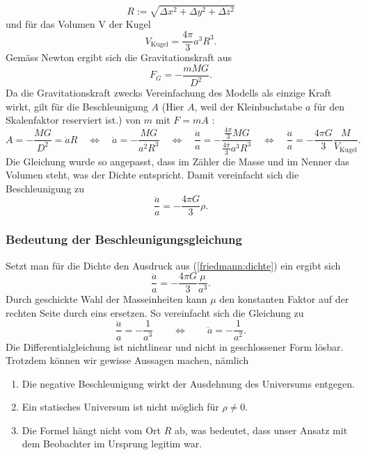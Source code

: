 \begin{refsection}
\[
R
:=
\sqrt{\Delta x^2 + \Delta y^2 + \Delta z^2}
\]
und für das Volumen V der Kugel
\[V_\text{Kugel} = \frac{4 \pi }{3} a^3 R^3.\]
Gemäss Newton ergibt sich die Gravitationskraft aus
\begin{equation}
F_G = -\frac{m M G}{D^2}.
\end{equation}
Da die Gravitationskraft zwecks Vereinfachung des Modells als einzige Kraft wirkt, gilt für die Beschleunigung $A$ (Hier $A$, weil der Kleinbuchstabe $a$ für den Skalenfaktor reserviert ist.) von $m$ mit $F = m A$ :
\[A = - \frac{M G}{D^2} = \ddot{a} R \quad\Leftrightarrow\quad \ddot{a} = -\frac{M G}{a^2 R^3} \quad\Leftrightarrow\quad \frac{\ddot{a}}{a} = -\frac{\frac{4 \pi }{3} M G}{\frac{4 \pi}{3}a^3 R^3} \quad\Leftrightarrow\quad \frac{\ddot{a}}{a} = -\frac{4 \pi G}{3} \frac{M}{V_\text{Kugel}}.\]
Die Gleichung wurde so angepasst, dass im Zähler die Masse und im Nenner das Volumen steht, was der Dichte entspricht. Damit vereinfacht sich die Beschleunigung zu
\begin{equation}
\frac{\ddot{a}}{a} = -\frac{ 4 \pi G}{3} \rho.
\end{equation}
\subsubsection{Bedeutung der Beschleunigungsgleichung}
Setzt man für die Dichte den Ausdruck aus (\ref{friedmann:dichte}) ein ergibt sich
\[\frac{\ddot{a}}{a} = -\frac{ 4 \pi G}{3} \frac{\mu}{a^3}.\]
Durch geschickte Wahl der Masseinheiten kann $\mu$ den konstanten Faktor auf der rechten Seite durch eins ersetzen. So vereinfacht sich die Gleichung zu
\[\frac{\ddot{a}}{a} = -\frac{1}{a^3} \qquad\Leftrightarrow\qquad \ddot{a} = -\frac{1}{a^2}.\]
Die Differentialgleichung ist nichtlinear und nicht in geschlossener Form lösbar. Trotzdem können wir gewisse Aussagen machen, nämlich
\begin{enumerate}
	\item Die negative Beschleunigung wirkt der Ausdehnung des Universums entgegen. 
	\item Ein statisches Universum ist nicht möglich für $\rho \neq 0$.
	\item Die Formel hängt nicht vom Ort $R$ ab, was bedeutet, dass unser Ansatz mit dem Beobachter im Ursprung legitim war.
\end{enumerate}


\end{refsection}

